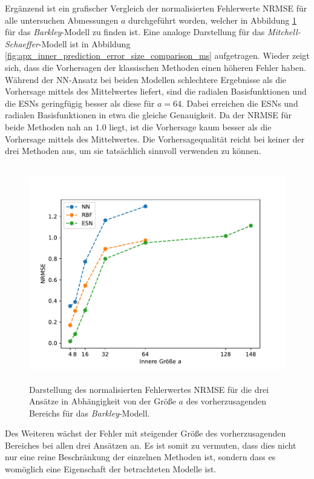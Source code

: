 Ergänzend ist ein grafischer Vergleich der normalisierten Fehlerwerte NRMSE für alle untersuchen Abmessungen $a$ durchgeführt worden, welcher in Abbildung \ref{fig:inner_prediction_error_size_comparison_barkley} für das \textit{Barkley}-Modell zu finden ist. Eine analoge Darstellung für das \textit{Mitchell-Schaeffer}-Modell ist in Abbildung \ref{fig:apx_inner_prediction_error_size_comparison_ms} aufgetragen. Wieder zeigt sich, dass die Vorhersagen der klassischen Methoden einen höheren Fehler haben. Während der \textsc{NN}-Ansatz bei beiden Modellen schlechtere Ergebnisse als die Vorhersage mittels des Mittelwertes liefert, sind die radialen Basisfunktionen und die \textsc{ESN}s geringfügig besser als diese für $a=64$. Dabei erreichen die \textsc{ESN}s und radialen Basisfunktionen in etwa die gleiche Genauigkeit. Da der NRMSE für beide Methoden nah an $1.0$ liegt, ist die Vorhersage kaum besser als die Vorhersage mittels des Mittelwertes. Die Vorhersagequalität reicht bei keiner der drei Methoden aus, um sie tatsächlich sinnvoll verwenden zu können.

\begin{figure}[H]
	\centering
	\includegraphics[height=3.7in]{figures/results/inner_cross_prediction/barkley_error_size_comparison.pdf}
	\caption{Darstellung des normalisierten Fehlerwertes NRMSE für die drei Ansätze in Abhängigkeit von der Größe $a$ des vorherzusagenden Bereichs für das \textit{Barkley}-Modell.}
	\label{fig:inner_prediction_error_size_comparison_barkley}
\end{figure}
 


Des Weiteren wächst der Fehler mit steigender Größe des vorherzusagenden Bereiches bei allen drei Ansätzen an. Es ist somit zu vermuten, dass dies nicht nur eine reine Beschränkung der einzelnen Methoden ist, sondern dass es womöglich eine Eigenschaft der betrachteten Modelle ist. \\


